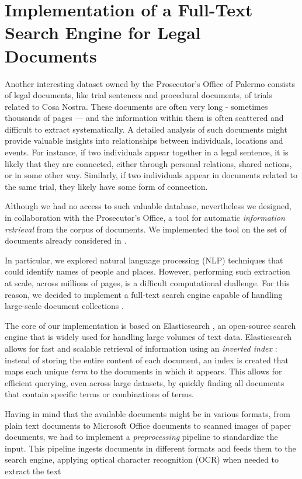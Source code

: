 \documentclass[a4paper, 10pt]{scrartcl}
\begin{document}
\section{Implementation of a Full-Text Search Engine for Legal Documents}

Another interesting dataset owned by the Prosecutor's Office of Palermo consists of legal documents, like trial sentences and procedural documents, of trials related to Cosa Nostra. These documents are often very long - sometimes thousands of pages — and the information within them is often scattered and difficult to extract systematically. A detailed analysis of such documents might provide valuable insights into relationships between individuals, locations and events. For instance, if two individuals appear together in a legal sentence, it is likely that they are connected, either through personal relations, shared actions, or in some other way. Similarly, if two individuals appear in documents related to the same trial, they likely have some form of connection.

Although we had no access to such valuable database, nevertheless we designed, in collaboration with the Prosecutor's Office, a tool for automatic \textit{information retrieval} from the corpus of documents. We implemented the tool on the set of documents already considered in \cite{tumminello_anagraphical_2021}.

In particular, we explored natural language processing (NLP) techniques that could identify names of people and places. However, performing such extraction at scale, across millions of pages, is a difficult computational challenge. For this reason, we decided to implement a full-text search engine capable of handling large-scale document collections \cite{baeza-yates_modern_2011}.

The core of our implementation is based on Elasticsearch \cite{noauthor_elasticsearch:_nodate}, an open-source search engine that is widely used for handling large volumes of text data. Elasticsearch allows for fast and scalable retrieval of information using an \textit{inverted index} \cite{baeza-yates_modern_2011}: instead of storing the entire content of each document, an index is created that maps each unique \textit{term} to the documents in which it appears. This allows for efficient querying, even across large datasets, by quickly finding all documents that contain specific terms or combinations of terms.

Having in mind that the available documents might be in various formats, from plain text documents to Microsoft Office documents to scanned images of paper documents, we had to implement a \textit{preprocessing} pipeline to standardize the input. This pipeline ingests documents in different formats and feeds them to the search engine, applying optical character recognition (OCR) when needed to extract the text
\end{document}
